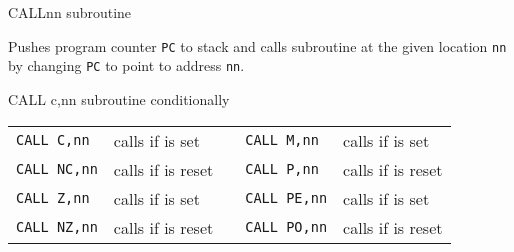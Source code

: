 \begin{basedescript}{
	\desclabelstyle{\multilinelabel}
	\desclabelwidth{3cm}}

	\begin{DetailItem}{CALL}{nn}
		{ subroutine}
		{}

		Pushes program counter {\tt PC} to stack and calls subroutine at the given location {\tt nn} by changing {\tt PC} to point to address {\tt nn}.

		\begin{DetailEffects}
			\FlagsCALLnn
		\end{DetailEffects}
		
		\begin{DetailTiming}
		\end{DetailTiming}

	\end{DetailItem}


	\begin{DetailItem}{CALL c,nn}{}
		{ subroutine conditionally}
		{}

		\vspace{1ex} %
		\begin{tabular}{@{}llcll}			
			{\tt CALL C,nn} & calls if \FlagCF{} is set & &
				{\tt CALL M,nn} & calls if \FlagSF{} is set\\
			{\tt CALL NC,nn} & calls if \FlagCF{} is reset & &
				{\tt CALL P,nn} & calls if \FlagSF{} is reset\\
			{\tt CALL Z,nn} & calls if \FlagZF{} is set & &
				{\tt CALL PE,nn} & calls if \FlagPV{} is set\\
			{\tt CALL NZ,nn} & calls if \FlagZF{} is reset & &
				{\tt CALL PO,nn} & calls if \FlagPV{} is reset\\
		\end{tabular}


\end{DetailItem}
\end{basedescript}
